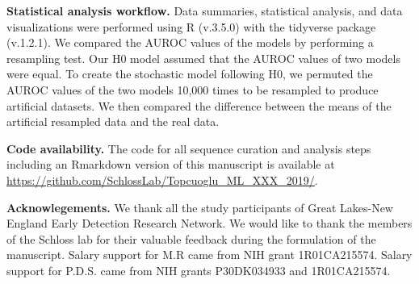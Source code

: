 \documentclass[11pt,]{article}
\begin{document}
\textbf{Statistical analysis workflow.} Data summaries, statistical
analysis, and data visualizations were performed using R (v.3.5.0) with
the tidyverse package (v.1.2.1). We compared the AUROC values of the
models by performing a resampling test. Our H0 model assumed that the
AUROC values of two models were equal. To create the stochastic model
following H0, we permuted the AUROC values of the two models 10,000
times to be resampled to produce artificial datasets. We then compared
the difference between the means of the artificial resampled data and
the real data.

\textbf{Code availability.} The code for all sequence curation and
analysis steps including an Rmarkdown version of this manuscript is
available at \url{https://github.com/SchlossLab/Topcuoglu_ML_XXX_2019/}.

\textbf{Acknowlegements.} We thank all the study participants of Great
Lakes-New England Early Detection Research Network. We would like to
thank the members of the Schloss lab for their valuable feedback during
the formulation of the manuscript. Salary support for M.R came from NIH
grant 1R01CA215574. Salary support for P.D.S. came from NIH grants
P30DK034933 and 1R01CA215574.

\newpage
\end{document}
